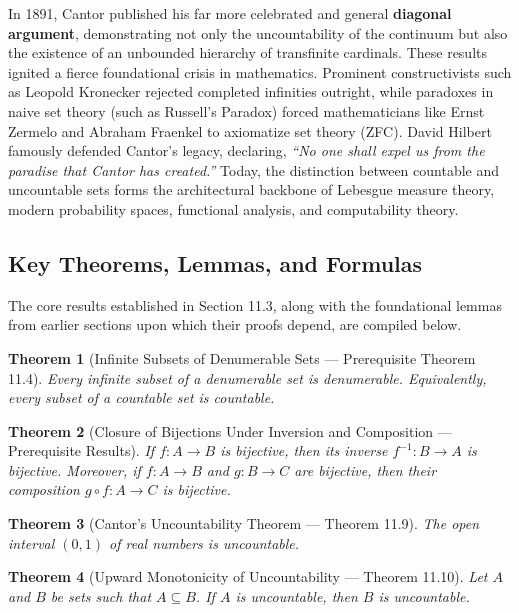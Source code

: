 \documentclass[11pt, letterpaper]{article}
\newtheorem{theorem}{Theorem}[section]
\theoremstyle{definition}
\theoremstyle{remark}
\begin{document}
In 1891, Cantor published his far more celebrated and general \textbf{diagonal argument}, demonstrating not only the uncountability of the continuum but also the existence of an unbounded hierarchy of transfinite cardinals. These results ignited a fierce foundational crisis in mathematics. Prominent constructivists such as Leopold Kronecker rejected completed infinities outright, while paradoxes in naive set theory (such as Russell's Paradox) forced mathematicians like Ernst Zermelo and Abraham Fraenkel to axiomatize set theory (ZFC). David Hilbert famously defended Cantor's legacy, declaring, \emph{``No one shall expel us from the paradise that Cantor has created.''} Today, the distinction between countable and uncountable sets forms the architectural backbone of Lebesgue measure theory, modern probability spaces, functional analysis, and computability theory.

\subsection{Key Theorems, Lemmas, and Formulas}

The core results established in Section 11.3, along with the foundational lemmas from earlier sections upon which their proofs depend, are compiled below.

\begin{theorem}[Infinite Subsets of Denumerable Sets — Prerequisite Theorem 11.4]
Every infinite subset of a denumerable set is denumerable. Equivalently, every subset of a countable set is countable.
\end{theorem}

\begin{theorem}[Closure of Bijections Under Inversion and Composition — Prerequisite Results]
If $f : A \to B$ is bijective, then its inverse $f^{-1} : B \to A$ is bijective. Moreover, if $f : A \to B$ and $g : B \to C$ are bijective, then their composition $g \circ f : A \to C$ is bijective.
\end{theorem}

\begin{theorem}[Cantor's Uncountability Theorem — Theorem 11.9]
The open interval $(0, 1)$ of real numbers is uncountable.
\end{theorem}

\begin{theorem}[Upward Monotonicity of Uncountability — Theorem 11.10]
Let $A$ and $B$ be sets such that $A \subseteq B$. If $A$ is uncountable, then $B$ is uncountable.
\end{theorem}
\end{document}
